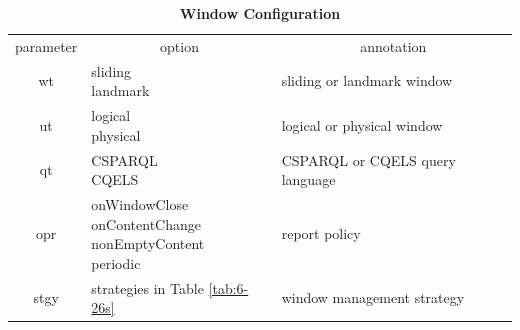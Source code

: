 \begin{table}[!htbp]
	\centering
    \caption{\textbf{Window Configuration}}
    \label{tab:6-wc}
    \begin{tabular}{|c||l|l|} \hline
    parameter & \multicolumn{1}{c|}{option} & \multicolumn{1}{c|}{annotation} \\ \hhline{|=#=|=|}
    wt & \makecell[l]{sliding \\ landmark} & sliding or landmark window \\ \hline
    ut & \makecell[l]{logical \\ physical} & logical or physical window \\ \hline
    qt & \makecell[l]{CSPARQL \\ CQELS} & CSPARQL or CQELS query language \\ \hline
    opr & \makecell[l]{onWindowClose \\ onContentChange \\ nonEmptyContent \\ periodic} & report policy \\ \hline 
    stgy & strategies in Table \ref{tab:6-26s} & window management strategy \\ \hline
    \end{tabular}
\end{table}
%
